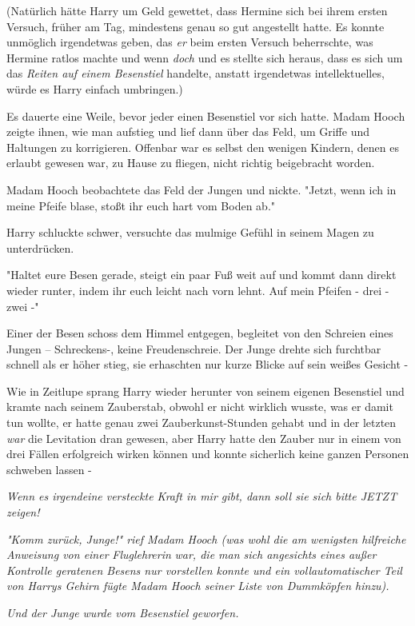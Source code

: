 {(Natürlich hätte Harry um Geld gewettet, dass Hermine sich bei ihrem ersten Versuch, früher am Tag, mindestens genau so gut angestellt hatte. Es konnte unmöglich irgendetwas geben, das \emph{er} beim ersten Versuch beherrschte, was Hermine ratlos machte und wenn \emph{doch} und es stellte sich heraus, dass es sich um das \emph{Reiten auf einem Besenstiel} handelte, anstatt irgendetwas intellektuelles, würde es Harry einfach umbringen.)

Es dauerte eine Weile, bevor jeder einen Besenstiel vor sich hatte. Madam Hooch zeigte ihnen, wie man aufstieg und lief dann über das Feld, um Griffe und Haltungen zu korrigieren. Offenbar war es selbst den wenigen Kindern, denen es erlaubt gewesen war, zu Hause zu fliegen, nicht richtig beigebracht worden.

Madam Hooch beobachtete das Feld der Jungen und nickte. "Jetzt, wenn ich in meine Pfeife blase, stoßt ihr euch hart vom Boden ab."

Harry schluckte schwer, versuchte das mulmige Gefühl in seinem Magen zu unterdrücken.

"Haltet eure Besen gerade, steigt ein paar Fuß weit auf und kommt dann direkt wieder runter, indem ihr euch leicht nach vorn lehnt. Auf mein Pfeifen - drei - zwei -"

Einer der Besen schoss dem Himmel entgegen, begleitet von den Schreien eines Jungen -- Schreckens-, keine Freudenschreie. Der Junge drehte sich furchtbar schnell als er höher stieg, sie erhaschten nur kurze Blicke auf sein weißes Gesicht -

Wie in Zeitlupe sprang Harry wieder herunter von seinem eigenen Besenstiel und kramte nach seinem Zauberstab, obwohl er nicht wirklich wusste, was er damit tun wollte, er hatte genau zwei Zauberkunst-Stunden gehabt und in der letzten \emph{war} die Levitation dran gewesen, aber Harry hatte den Zauber nur in einem von drei Fällen erfolgreich wirken können und konnte sicherlich keine ganzen Personen schweben lassen -

\emph{Wenn es irgendeine versteckte Kraft in mir gibt, dann soll sie sich bitte JETZT zeigen!}

\emph{"Komm zurück, Junge!" rief Madam Hooch (was wohl die am wenigsten hilfreiche Anweisung von einer} \emph{\emph{Fluglehrerin}} \emph{war, die man sich angesichts eines außer Kontrolle geratenen Besens nur vorstellen konnte und ein vollautomatischer Teil von Harrys Gehirn fügte Madam Hooch seiner Liste von Dummköpfen hinzu).}

\emph{Und der Junge wurde vom Besenstiel geworfen.}

}

